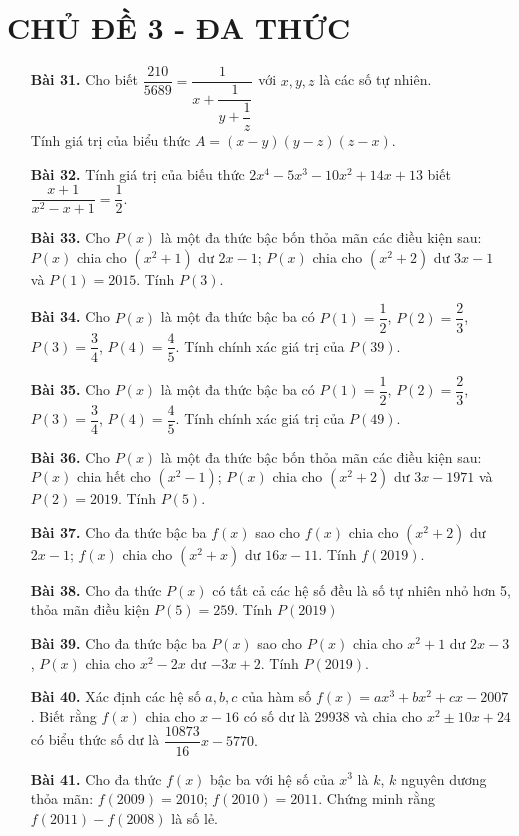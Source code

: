 \documentclass[12pt,a4paper]{article}
\begin{document}
\section*{CHỦ ĐỀ 3 - ĐA THỨC}
\begin{enumerate}
\item[\textbf{Bài 31.}] Cho biết $\dfrac{210}{5689}=\dfrac{1}{x + \dfrac{1}{y + \dfrac{1}{z}}}$ với $x,y,z$ là các số tự nhiên. \\
Tính giá trị của biểu thức $A = (x-y)(y-z)(z-x)$.
\item[\textbf{Bài 32.}] Tính giá trị của biếu thức $2x^4 - 5x^3 - 10x^2 + 14x + 13$ biết $\dfrac{x+1}{x^2 - x + 1} = \dfrac{1}{2}.$
\item[\textbf{Bài 33.}] Cho $P(x)$ là một đa thức bậc bốn thỏa mãn các điều kiện sau: $P(x)$ chia cho $(x^2+1)$ dư $2x-1$; $P(x)$ chia cho $(x^2+2)$ dư $3x-1$ và $P(1)=2015$. Tính $P(3)$.
\item[\textbf{Bài 34.}] Cho $P(x)$ là một đa thức bậc ba có $P(1) = \dfrac{1}{2}$, $P(2) = \dfrac{2}{3}$, $P(3) = \dfrac{3}{4}$, $P(4) = \dfrac{4}{5}$. Tính chính xác giá trị của $P(39)$.
\item[\textbf{Bài 35.}] Cho $P(x)$ là một đa thức bậc ba có $P(1) = \dfrac{1}{2}$, $P(2) = \dfrac{2}{3}$, $P(3) = \dfrac{3}{4}$, $P(4) = \dfrac{4}{5}$. Tính chính xác giá trị của $P(49)$.
\item[\textbf{Bài 36.}] Cho $P(x)$ là một đa thức bậc bốn thỏa mãn các điều kiện sau: $P(x)$ chia hết cho $(x^2 - 1)$; $P(x)$ chia cho $(x^2 + 2)$ dư $3x-1971$ và $P(2) = 2019$. Tính $P(5)$.
\item[\textbf{Bài 37.}] Cho đa thức bậc ba $f(x)$ sao cho $f(x)$ chia cho $(x^2 + 2)$ dư $2x-1$; $f(x)$ chia cho $(x^2 + x)$ dư $16x-11$. Tính $f(2019).$
\item[\textbf{Bài 38.}] Cho đa thức $P(x)$ có tất cả các hệ số đều là số tự nhiên nhỏ hơn 5, thỏa mãn điều kiện $P(5) = 259$. Tính $P(2019)$
\item[\textbf{Bài 39.}] Cho đa thức bậc ba $P(x)$ sao cho $P(x)$ chia cho $x^2 + 1$ dư $2x-3$, $P(x)$ chia cho $x^2 - 2x$ dư $-3x+2$. Tính $P(2019)$.
\item[\textbf{Bài 40.}] Xác định các hệ số $a,b,c$ của hàm số $f(x) = ax^3 + bx^2 +cx - 2007$. Biết rằng $f(x)$ chia cho $x-16$ có số dư là 29938 và chia cho $x^2 \pm 10x + 24$ có biểu thức số dư là $\dfrac{10873}{16}x-5770.$
\item[\textbf{Bài 41.}] Cho đa thức $f(x)$ bậc ba với hệ số của $x^3$ là $k$, $k$ nguyên dương thỏa mãn: $f(2009) = 2010$; $f(2010) = 2011$. Chứng minh rằng $f(2011) - f(2008)$ là số lẻ.

\end{enumerate}
\end{document}
